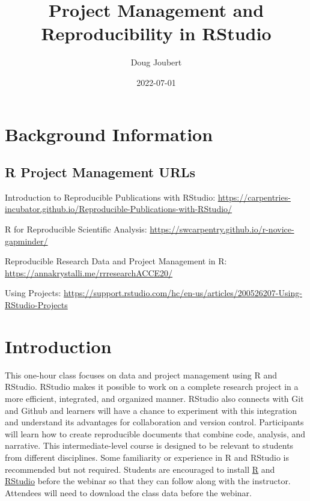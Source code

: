 \documentclass[
]{article}
\title{Project Management and Reproducibility in RStudio}
\author{Doug Joubert}
\date{2022-07-01}
\begin{document}
\maketitle

{
\setcounter{tocdepth}{2}
\tableofcontents
}
\hypertarget{background-information}{%
\section{Background Information}\label{background-information}}

\hypertarget{r-project-management-urls}{%
\subsection{R Project Management URLs}\label{r-project-management-urls}}

Introduction to Reproducible Publications with RStudio:
\url{https://carpentries-incubator.github.io/Reproducible-Publications-with-RStudio/}

R for Reproducible Scientific Analysis:
\url{https://swcarpentry.github.io/r-novice-gapminder/}

Reproducible Research Data and Project Management in R:
\url{https://annakrystalli.me/rrresearchACCE20/}

Using Projects:
\url{https://support.rstudio.com/hc/en-us/articles/200526207-Using-RStudio-Projects}

\hypertarget{introduction}{%
\section{Introduction}\label{introduction}}

This one-hour class focuses on data and project management using R and
RStudio. RStudio makes it possible to work on a complete research
project in a more efficient, integrated, and organized manner. RStudio
also connects with Git and Github and learners will have a chance to
experiment with this integration and understand its advantages for
collaboration and version control. Participants will learn how to create
reproducible documents that combine code, analysis, and narrative. This
intermediate-level course is designed to be relevant to students from
different disciplines. Some familiarity or experience in R and RStudio
is recommended but not required. Students are encouraged to install
\href{https://mirrors.nics.utk.edu/cran/}{R} and
\href{https://www.rstudio.com/products/rstudio/download/\#download}{RStudio}
before the webinar so that they can follow along with the instructor.
Attendees will need to download the class data before the webinar.
\end{document}
